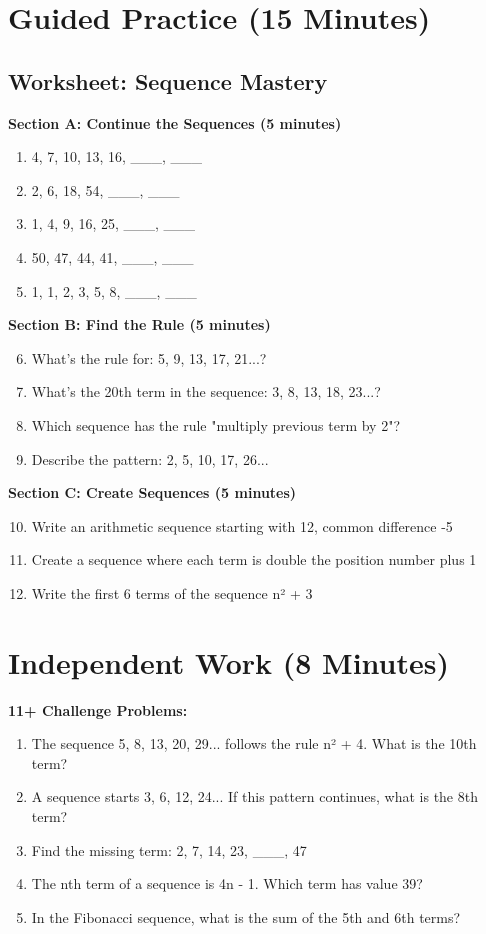 \documentclass{article}
\begin{document}
\section{Guided Practice (15 Minutes)}

\subsection*{Worksheet: Sequence Mastery}

\textbf{Section A: Continue the Sequences (5 minutes)}
\begin{enumerate}
    \item 4, 7, 10, 13, 16, \_\_\_, \_\_\_
    \item 2, 6, 18, 54, \_\_\_, \_\_\_  
    \item 1, 4, 9, 16, 25, \_\_\_, \_\_\_
    \item 50, 47, 44, 41, \_\_\_, \_\_\_
    \item 1, 1, 2, 3, 5, 8, \_\_\_, \_\_\_
\end{enumerate}

\textbf{Section B: Find the Rule (5 minutes)}
\begin{enumerate}
    \setcounter{enumi}{5}
    \item What's the rule for: 5, 9, 13, 17, 21...?
    \item What's the 20th term in the sequence: 3, 8, 13, 18, 23...?
    \item Which sequence has the rule "multiply previous term by 2"?
    \item Describe the pattern: 2, 5, 10, 17, 26...
\end{enumerate}

\textbf{Section C: Create Sequences (5 minutes)}
\begin{enumerate}
    \setcounter{enumi}{9}
    \item Write an arithmetic sequence starting with 12, common difference -5
    \item Create a sequence where each term is double the position number plus 1
    \item Write the first 6 terms of the sequence n² + 3
\end{enumerate}

\section{Independent Work (8 Minutes)}

\textbf{11+ Challenge Problems:}
\begin{enumerate}
    \item The sequence 5, 8, 13, 20, 29... follows the rule n² + 4. What is the 10th term?
    \item A sequence starts 3, 6, 12, 24... If this pattern continues, what is the 8th term?
    \item Find the missing term: 2, 7, 14, 23, \_\_\_, 47
    \item The nth term of a sequence is 4n - 1. Which term has value 39?
    \item In the Fibonacci sequence, what is the sum of the 5th and 6th terms?
\end{enumerate}
\end{document}
